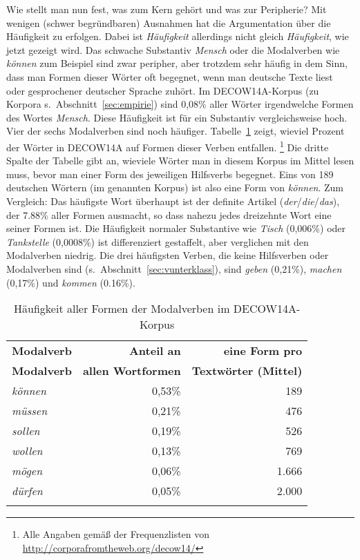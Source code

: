 Wie stellt man nun fest, was zum Kern gehört und was zur Peripherie?
Mit wenigen (schwer begründbaren) Ausnahmen hat die Argumentation über die Häufigkeit zu erfolgen.
Dabei ist \textit{Häufigkeit} allerdings nicht gleich \textit{Häufigkeit}, wie jetzt gezeigt wird.
Das schwache Substantiv \textit{Mensch} oder die Modalverben wie \textit{können} zum Beispiel sind zwar peripher, aber trotzdem sehr häufig in dem Sinn, dass man Formen dieser Wörter oft begegnet, wenn man deutsche Texte liest oder gesprochener deutscher Sprache zuhört.
Im DECOW14A-Korpus (zu Korpora s.\ Abschnitt~\ref{sec:empirie}) sind 0,08\% aller Wörter irgendwelche Formen des Wortes \textit{Mensch}.
Diese Häufigkeit ist für ein Substantiv vergleichsweise hoch. 
Vier der sechs Modalverben sind noch häufiger.
Tabelle~\ref{tab:modvfreq} zeigt, wieviel Prozent der Wörter in DECOW14A auf Formen dieser Verben entfallen.%
\footnote{Alle Angaben gemäß der Frequenzlisten von \url{http://corporafromtheweb.org/decow14/}}
Die dritte Spalte der Tabelle gibt an, wieviele Wörter man in diesem Korpus im Mittel lesen muss, bevor man einer Form des jeweiligen Hilfsverbs begegnet.
Eins von 189 deutschen Wörtern (im genannten Korpus) ist also eine Form von \textit{können}.
Zum Vergleich: Das häufigste Wort überhaupt ist der definite Artikel (\textit{der}\slash\textit{die}\slash\textit{das}), der 7.88\% aller Formen ausmacht, so dass nahezu jedes dreizehnte Wort eine seiner Formen ist.
Die Häufigkeit normaler Substantive wie \textit{Tisch} (0,006\%) oder \textit{Tankstelle} (0,0008\%) ist differenziert gestaffelt, aber verglichen mit den Modalverben niedrig.
Die drei häufigsten Verben, die keine Hilfsverben oder Modalverben sind (s.\ Abschnitt~\ref{sec:vunterklass}), sind \textit{geben} (0,21\%), \textit{machen} (0,17\%) und \textit{kommen} (0.16\%).

\begin{table}
	\begin{tabular}{lrr}
	  \lsptoprule
	  \textbf{Modalverb} & \textbf{Anteil an} & \textbf{eine Form pro}\\
	  \textbf{Modalverb} & \textbf{allen Wortformen} & \textbf{Textwörter (Mittel)}\\
	  \midrule
	  \textit{können} & 0,53\% &   189 \\
	  \textit{müssen} & 0,21\% &   476 \\
	  \textit{sollen} & 0,19\% &   526 \\
	  \textit{wollen} & 0,13\% &   769 \\
	  \textit{mögen}  & 0,06\% & 1.666\\
	  \textit{dürfen} & 0,05\% & 2.000\\
	  \lspbottomrule
	\end{tabular}
	\label{tab:modvfreq}
	\caption{Häufigkeit aller Formen der Modalverben im DECOW14A-Korpus}
\end{table}

